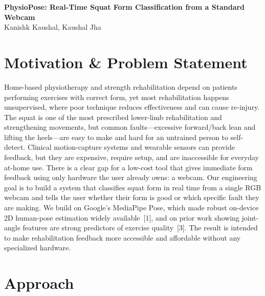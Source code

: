 \documentclass[11pt, letterpaper]{article}
\begin{document}
\begin{center}
  {\Large\bfseries\color{headcolor} PhysioPose: Real-Time Squat Form Classification from a Standard Webcam}\\[4pt]
  {\normalsize Kanishk Kaushal, Kaushal Jha}\\[2pt]
\end{center}

\vspace{4pt}

\section{Motivation \& Problem Statement}

Home-based physiotherapy and strength rehabilitation depend on patients
performing exercises with correct form, yet most rehabilitation happens
unsupervised, where poor technique reduces effectiveness and can cause
re-injury. The squat is one of the most prescribed lower-limb rehabilitation
and strengthening movements, but common faults---excessive forward/back lean
and lifting the heels---are easy to make and hard for an untrained person to
self-detect. Clinical motion-capture systems and wearable sensors can provide
feedback, but they are expensive, require setup, and are inaccessible for
everyday at-home use. There is a clear gap for a low-cost tool that gives
immediate form feedback using only hardware the user already owns: a webcam.
Our engineering goal is to build a system that classifies squat form in real
time from a single RGB webcam and tells the user whether their form is good or
which specific fault they are making. We build on Google's MediaPipe Pose,
which made robust on-device 2D human-pose estimation widely available~[1], and
on prior work showing joint-angle features are strong predictors of exercise
quality~[3]. The result is intended to make rehabilitation feedback more
accessible and affordable without any specialized hardware.

\section{Approach}
\end{document}
